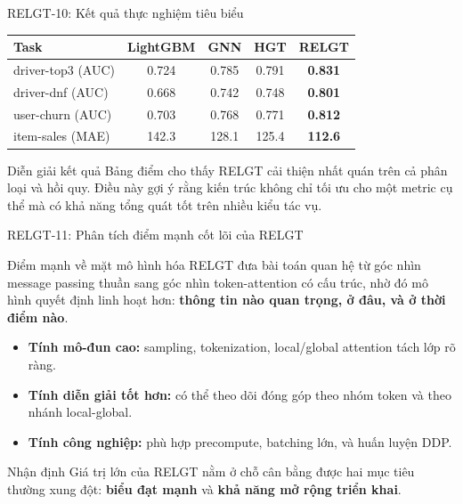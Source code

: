 \documentclass[aspectratio=169,11pt]{beamer}
\begin{document}
\begin{frame}{RELGT-10: Kết quả thực nghiệm tiêu biểu}
  \begin{table}
    \centering
    \small
    \begin{tabular}{lcccc}
      \toprule
      Task & LightGBM & GNN & HGT & RELGT \\
      \midrule
      driver-top3 (AUC) & 0.724 & 0.785 & 0.791 & \textbf{0.831} \\
      driver-dnf (AUC) & 0.668 & 0.742 & 0.748 & \textbf{0.801} \\
      user-churn (AUC) & 0.703 & 0.768 & 0.771 & \textbf{0.812} \\
      item-sales (MAE) & 142.3 & 128.1 & 125.4 & \textbf{112.6} \\
      \bottomrule
    \end{tabular}
  \end{table}
\begin{exampleblock}{Diễn giải kết quả}
  Bảng điểm cho thấy RELGT cải thiện nhất quán trên cả phân loại và hồi quy. Điều này gợi ý rằng kiến trúc không chỉ tối ưu cho một metric cụ thể mà có khả năng tổng quát tốt trên nhiều kiểu tác vụ.
\end{exampleblock}
\end{frame}

\begin{frame}{RELGT-11: Phân tích điểm mạnh cốt lõi của RELGT}
  \begin{block}{Điểm mạnh về mặt mô hình hóa}
    RELGT đưa bài toán quan hệ từ góc nhìn message passing thuần sang góc nhìn token-attention có cấu trúc, nhờ đó mô hình quyết định linh hoạt hơn: \textbf{thông tin nào quan trọng, ở đâu, và ở thời điểm nào}.
  \end{block}
  \begin{itemize}
    \item \textbf{Tính mô-đun cao:} sampling, tokenization, local/global attention tách lớp rõ ràng.
    \item \textbf{Tính diễn giải tốt hơn:} có thể theo dõi đóng góp theo nhóm token và theo nhánh local-global.
    \item \textbf{Tính công nghiệp:} phù hợp precompute, batching lớn, và huấn luyện DDP.
  \end{itemize}
  \begin{exampleblock}{Nhận định}
    Giá trị lớn của RELGT nằm ở chỗ cân bằng được hai mục tiêu thường xung đột: \textbf{biểu đạt mạnh} và \textbf{khả năng mở rộng triển khai}.
  \end{exampleblock}
\end{frame}
\end{document}
